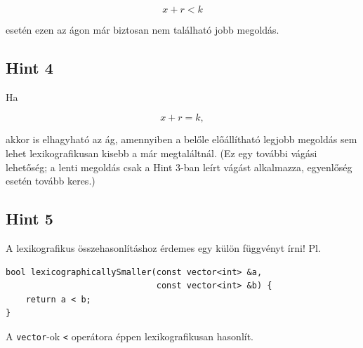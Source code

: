 \documentclass[12pt,a4paper]{article}
\begin{document}
\[
x+r < k
\]

esetén ezen az ágon már biztosan nem található jobb megoldás.

\subsection*{Hint 4}

Ha

\[
x+r = k,
\]

akkor is elhagyható az ág, amennyiben a belőle előállítható legjobb megoldás sem lehet lexikografikusan kisebb a már megtaláltnál. (Ez egy további vágási lehetőség; a lenti megoldás csak a Hint 3-ban leírt vágást alkalmazza, egyenlőség esetén tovább keres.)

\subsection*{Hint 5}
A lexikografikus összehasonlításhoz érdemes egy külön függvényt írni! Pl.
\begin{verbatim}
bool lexicographicallySmaller(const vector<int> &a,
                              const vector<int> &b) {
    return a < b;
}
\end{verbatim}
A \texttt{vector}-ok \texttt{<} operátora éppen lexikografikusan hasonlít.
\end{document}
